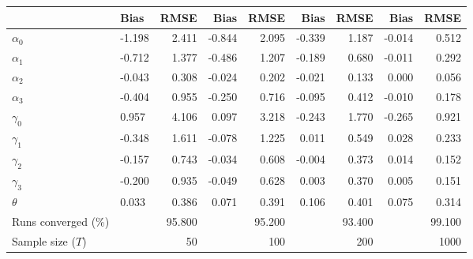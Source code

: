 
\begin{tabular}[t]{llrrrrrrr}
\toprule
  & Bias & RMSE & Bias & RMSE & Bias & RMSE & Bias & RMSE\\
\midrule
$\alpha_{0}$ & -1.198 & 2.411 & -0.844 & 2.095 & -0.339 & 1.187 & -0.014 & 0.512\\
$\alpha_{1}$ & -0.712 & 1.377 & -0.486 & 1.207 & -0.189 & 0.680 & -0.011 & 0.292\\
$\alpha_{2}$ & -0.043 & 0.308 & -0.024 & 0.202 & -0.021 & 0.133 & 0.000 & 0.056\\
$\alpha_{3}$ & -0.404 & 0.955 & -0.250 & 0.716 & -0.095 & 0.412 & -0.010 & 0.178\\
$\gamma_{0}$ & 0.957 & 4.106 & 0.097 & 3.218 & -0.243 & 1.770 & -0.265 & 0.921\\
$\gamma_{1}$ & -0.348 & 1.611 & -0.078 & 1.225 & 0.011 & 0.549 & 0.028 & 0.233\\
$\gamma_{2}$ & -0.157 & 0.743 & -0.034 & 0.608 & -0.004 & 0.373 & 0.014 & 0.152\\
$\gamma_{3}$ & -0.200 & 0.935 & -0.049 & 0.628 & 0.003 & 0.370 & 0.005 & 0.151\\
$\theta$ & 0.033 & 0.386 & 0.071 & 0.391 & 0.106 & 0.401 & 0.075 & 0.314\\
Runs converged (\%) &  & 95.800 &  & 95.200 &  & 93.400 &  & 99.100\\
Sample size ($T$) &  & 50 &  & 100 &  & 200 &  & 1000\\
\bottomrule
\end{tabular}
